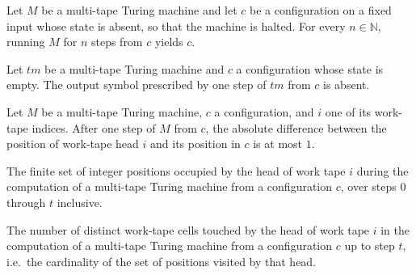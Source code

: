 \begin{lemma}
\label{Turing.MultiTapeTM.runFrom_of_halt}
\leanok
{}
Let $M$ be a multi-tape Turing machine and let $c$ be a configuration on a fixed input
whose state is absent, so that the machine is halted. For every $n\in\mathbb{N}$,
running $M$ for $n$ steps from $c$ yields $c$.
\end{lemma}

\begin{lemma}
\label{Turing.MultiTapeTM.outputSymbol_of_halt}
\leanok
{}
Let $tm$ be a multi-tape Turing machine and $c$ a configuration whose state is empty.
The output symbol prescribed by one step of $tm$ from $c$ is absent.
\end{lemma}

\begin{lemma}
\label{Turing.MultiTapeTM.workTapePos_step_le}
\leanok
{}
Let $M$ be a multi-tape Turing machine, $c$ a configuration, and $i$ one of its
work-tape indices. After one step of $M$ from $c$, the absolute difference between the
position of work-tape head $i$ and its position in $c$ is at most $1$.
\end{lemma}

\begin{definition}
\label{Turing.MultiTapeTM.visitedByTapeHead}
\leanok
{}
The finite set of integer positions occupied by the head of work tape $i$
during the computation of a multi-tape Turing machine from a configuration
$c$, over steps $0$ through $t$ inclusive.
\end{definition}

\begin{definition}
\label{Turing.MultiTapeTM.spaceUsedByTape}
\leanok
{}
The number of distinct work-tape cells touched by the head of work tape $i$ in
the computation of a multi-tape Turing machine from a configuration $c$ up to
step $t$, i.e.\ the cardinality of the set of positions visited by that head.
\end{definition}

